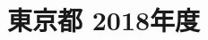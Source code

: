 \documentclass[../../hsm_tok_q.tex]{subfiles}
\begin{document}
    \section{東京都 2018年度}
    \subsection{　}
    
    \newpage
    \subsection{　}
    
    \newpage
    \subsection{　}
    
    \newpage
    \subsection{　}
    
    \newpage
    \subsection{　}
    
\end{document}
